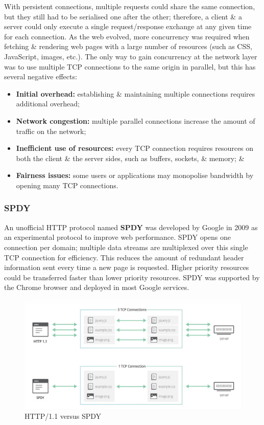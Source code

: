 \documentclass[a4paper,11pt]{article}
\begin{document}
With persistent connections, multiple requests could share the same connection, but they still had to be serialised one after the other;
therefore, a client \& a server could only execute a single request/response exchange at any given time for each connection.
As the web evolved, more concurrency was required when fetching \& rendering web pages with a large number of resources (such as CSS, JavaScript, images, etc.).
The only way to gain concurrency at the network layer was to use multiple TCP connections to the same origin in parallel, but this has several negative effects:
\begin{itemize}
    \item   \textbf{Initial overhead:} establishing \& maintaining multiple connections requires additional overhead;
    \item   \textbf{Network congestion:} multiple parallel connections increase the amount of traffic on the network;
    \item   \textbf{Inefficient use of resources:} every TCP connection requires resources on both the client \& the server sides, such as buffers, sockets, \& memory; \&
    \item   \textbf{Fairness issues:} some users or applications may monopolise bandwidth by opening many TCP connections.
\end{itemize}

\subsubsection{SPDY}
An unofficial HTTP protocol named \textbf{SPDY} was developed by Google in 2009 as an experimental protocol to improve web performance.
SPDY opens one connection per domain;
multiple data streams are multiplexed over this single TCP connection for efficiency.
This reduces the amount of redundant header information sent every time a new page is requested.
Higher priority resources could be transferred faster than lower priority resources.
SPDY was supported by the Chrome browser and deployed in most Google services.

\begin{figure}[H]
    \centering
    \includegraphics[width=\textwidth]{./images/http11vsspdy.png}
    \caption{HTTP/1.1 versus SPDY}
\end{figure}
\end{document}
